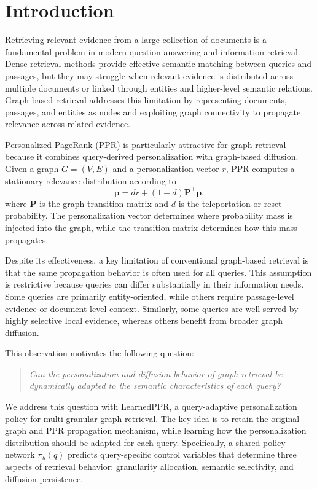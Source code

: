 \documentclass[conference]{IEEEtran}
\newcommand{\method}{LearnedPPR}
\newcommand{\q}{q}
\newcommand{\reset}{r}
\newcommand{\policy}{\pi_{\theta}}
\begin{document}
\section{Introduction}

Retrieving relevant evidence from a large collection of documents is
a fundamental problem in modern question answering and information
retrieval. Dense retrieval methods provide effective semantic
matching between queries and passages, but they may struggle when
relevant evidence is distributed across multiple documents or linked
through entities and higher-level semantic relations. Graph-based
retrieval addresses this limitation by representing documents,
passages, and entities as nodes and exploiting graph connectivity to
propagate relevance across related evidence.

Personalized PageRank (PPR) is particularly attractive for graph
retrieval because it combines query-derived personalization with
graph-based diffusion. Given a graph $G=(V,E)$ and a personalization
vector $\reset$, PPR computes a stationary relevance distribution
according to
\begin{equation}
\mathbf{p}
=
d\reset
+
(1-d)\mathbf{P}^{\top}\mathbf{p},
\label{eq:ppr}
\end{equation}
where $\mathbf{P}$ is the graph transition matrix and $d$ is the
teleportation or reset probability. The personalization vector
determines where probability mass is injected into the graph, while
the transition matrix determines how this mass propagates.

Despite its effectiveness, a key limitation of conventional
graph-based retrieval is that the same propagation behavior is often
used for all queries. This assumption is restrictive because queries
can differ substantially in their information needs. Some queries are
primarily entity-oriented, while others require passage-level
evidence or document-level context. Similarly, some queries are
well-served by highly selective local evidence, whereas others benefit
from broader graph diffusion.

This observation motivates the following question:

\begin{quote}
\emph{Can the personalization and diffusion behavior of graph
retrieval be dynamically adapted to the semantic characteristics of
each query?}
\end{quote}

We address this question with \method, a query-adaptive
personalization policy for multi-granular graph retrieval. The key
idea is to retain the original graph and PPR propagation mechanism,
while learning how the personalization distribution should be adapted
for each query. Specifically, a shared policy network
$\policy(\q)$ predicts query-specific control variables that determine
three aspects of retrieval behavior: granularity allocation,
semantic selectivity, and diffusion persistence.
\end{document}
